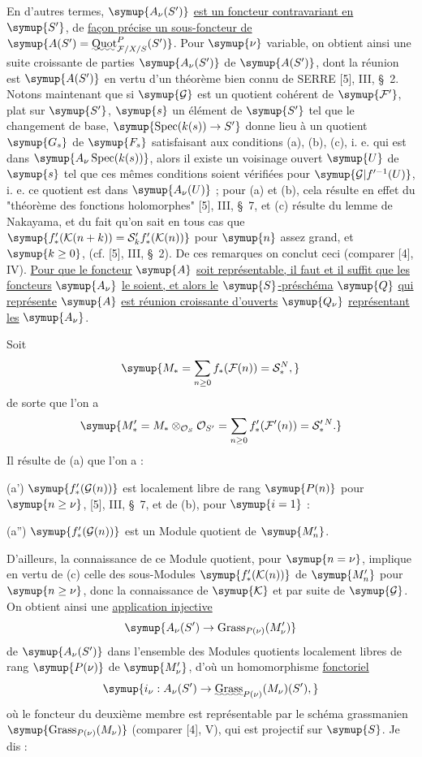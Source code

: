 En d'autres termes, $\symup{A_\nu(S')}$ \uline{est un foncteur contravariant en} $\symup{S'}$, de \uline{façon
précise un sous-foncteur de}
$\symup{A(S')=\mathop{\text{\uwave{Quot}}}\nolimits^P_{\mathcal F/X/S}(S')}$. Pour $\symup{\nu}$
variable, on obtient ainsi une suite croissante de parties $\symup{A_\nu(S')}$ de
$\symup{A(S')}$, dont la réunion est $\symup{A(S')}$ en vertu d'un théorème bien connu de
SERRE [5], III, \S~2. Notons maintenant que si $\symup{\mathcal G}$ est un quotient
cohérent de $\symup{\mathcal F'}$, plat sur $\symup{S'}$, $\symup{s}$ un élément de $\symup{S'}$ tel que le
changement de base, $\symup{\operatorname{Spec}(k(s))\to S'}$ donne lieu à
un quotient $\symup{G_s}$ de $\symup{F_s}$ satisfaisant aux conditions (a),
(b), (c), i. e. qui est dans $\symup{A_\nu\operatorname{Spec}(k(s))}$, alors il existe
un voisinage ouvert $\symup{U}$ de $\symup{s}$ tel que ces mêmes conditions soient vérifiées
pour $\symup{\mathcal G|f'^{-1}(U)}$, i. e. ce quotient est dans $\symup{A_\nu(U)}$ ; pour (a)
et (b), cela résulte en effet du "théorème des fonctions holomorphes" [5],
III, \S~7, et (c) résulte du lemme de Nakayama, et du fait qu'on sait en tous
cas que
$\symup{f'_*(\mathcal K(n+k))=\mathcal S'_k f'_*(\mathcal K(n))}$
pour $\symup{n}$ assez grand, et $\symup{k\geq0}$, (cf. [5], III, \S~2). De ces remarques on
conclut ceci (comparer [4], IV). \uline{Pour que le foncteur} $\symup{A}$ \uline{soit représentable,
il faut et il suffit que les foncteurs} $\symup{A_\nu}$ \uline{le soient, et alors le}
$\symup{S}$\uline{-préschéma} $\symup{Q}$ \uline{qui représente} $\symup{A}$ \uline{est réunion croissante d'ouverts} $\symup{Q_\nu}$
\uline{représentant les} $\symup{A_\nu}$.

Soit
\[
\symup{M_* =\sum_{n\geq0}f_*(\mathcal F(n))=\mathcal S_*^{N},}
\]
de sorte que l'on a
\[
\symup{M'_* =M_*\otimes_{\mathcal O_S}\mathcal O_{S'}
=\sum_{n\geq0}f'_*(\mathcal F'(n))=\mathcal S'_*{}^{N}.}
\]
Il résulte de (a) que l'on a :

\noindent (a') $\symup{f'_*(\mathcal G(n))}$ est localement libre de rang $\symup{P(n)}$ pour
$\symup{n\geq\nu}$, [5], III, \S~7, et de (b), pour $\symup{i=1}$ :

\noindent (a'') $\symup{f'_*(\mathcal G(n))}$ est un Module quotient de $\symup{M'_n}$.

D'ailleurs, la connaissance de ce Module quotient, pour $\symup{n=\nu}$, implique en
vertu de (c) celle des sous-Modules $\symup{f'_*(\mathcal K(n))}$ de $\symup{M'_n}$ pour
$\symup{n\geq\nu}$, donc la connaissance de $\symup{\mathcal K}$ et par suite de $\symup{\mathcal G}$.
On obtient ainsi une \uline{application injective}
\[
\symup{A_\nu(S')\to\operatorname{Grass}_{P(\nu)}(M'_\nu)}
\]
de $\symup{A_\nu(S')}$ dans l'ensemble des Modules quotients localement libres de rang
$\symup{P(\nu)}$ de $\symup{M'_\nu}$, d'où un homomorphisme \uline{fonctoriel}
\[
\symup{i_\nu:A_\nu(S')\to
\mathop{\text{\uwave{Grass}}}\nolimits_{P(\nu)}(M_\nu)(S'),}
\]
où le foncteur du deuxième membre est représentable par le schéma grassmanien
$\symup{\operatorname{Grass}_{P(\nu)}(M_\nu)}$ (comparer [4], V), qui est projectif
sur $\symup{S}$. Je dis :

